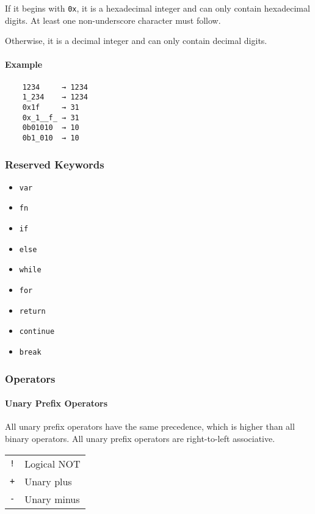 If it begins with \verb|0x|, it is a hexadecimal integer and can only contain hexadecimal digits. At least one non-underscore character must follow.

Otherwise, it is a decimal integer and can only contain decimal digits.

\paragraph{Example}

\begin{verbatim}
    1234     → 1234
    1_234    → 1234
    0x1f     → 31
    0x_1__f_ → 31
    0b01010  → 10
    0b1_010  → 10
\end{verbatim}

\subsubsection{Reserved Keywords}

\begin{itemize}
    \item \verb|var|
    \item \verb|fn|
    \item \verb|if|
    \item \verb|else|
    \item \verb|while|
    \item \verb|for|
    \item \verb|return|
    \item \verb|continue|
    \item \verb|break|
\end{itemize}

\subsubsection{Operators}

\paragraph{Unary Prefix Operators}

All unary prefix operators have the same precedence, which is higher than all binary operators. All unary prefix operators are right-to-left associative.

\begin{table}[H]
    \begin{tabular}{ l l }
        \verb|!| & Logical NOT \\
        \verb|+| & Unary plus  \\
        \verb|-| & Unary minus
    \end{tabular}
\end{table}

